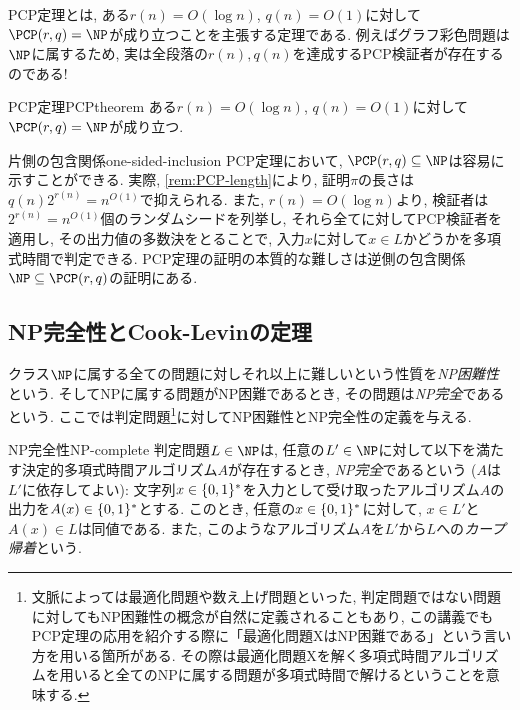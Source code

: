 PCP定理とは, ある$r(n)=O(\log n)$, $q(n)=O(1)$に対して$\PCP(r,q)=\NP$が成り立つことを主張する定理である.
例えばグラフ彩色問題は$\NP$に属するため, 実は全段落の$r(n),q(n)$を達成するPCP検証者が存在するのである!

\begin{theorem}{PCP定理}{PCPtheorem}
  ある$r(n)=O(\log n)$, $q(n)=O(1)$に対して$\PCP(r,q)=\NP$が成り立つ.
\end{theorem}

\begin{remark}{片側の包含関係}{one-sided-inclusion}
  PCP定理において, $\PCP(r,q)\subseteq \NP$は容易に示すことができる.
  実際, \cref{rem:PCP-length}により, 証明$\pi$の長さは$q(n)2^{r(n)} = n^{O(1)}$で抑えられる.
  また, $r(n)=O(\log n)$より, 検証者は$2^{r(n)}=n^{O(1)}$個のランダムシードを列挙し, それら全てに対してPCP検証者を適用し, その出力値の多数決をとることで, 入力$x$に対して$x\in L$かどうかを多項式時間で判定できる.
  PCP定理の証明の本質的な難しさは逆側の包含関係$\NP\subseteq \PCP(r,q)$の証明にある.
\end{remark}

\subsection{NP完全性とCook-Levinの定理}

クラス$\NP$に属する全ての問題に対しそれ以上に難しいという性質を\emph{NP困難性}という.
そしてNPに属する問題がNP困難であるとき, その問題は\emph{NP完全}であるという.
ここでは判定問題\footnote{文脈によっては最適化問題や数え上げ問題といった, 判定問題ではない問題に対してもNP困難性の概念が自然に定義されることもあり, この講義でもPCP定理の応用を紹介する際に「最適化問題XはNP困難である」という言い方を用いる箇所がある. その際は最適化問題Xを解く多項式時間アルゴリズムを用いると全てのNPに属する問題が多項式時間で解けるということを意味する.}に対してNP困難性とNP完全性の定義を与える.

\begin{definition}{NP完全性}{NP-complete}
  判定問題$L\in \NP$は, 任意の$L'\in\NP$に対して以下を満たす決定的多項式時間アルゴリズム$A$が存在するとき, \emph{NP完全}であるという ($A$は$L'$に依存してよい):
  文字列$x\in\{0,1\}^*$を入力として受け取ったアルゴリズム$A$の出力を$A(x)\in\{0,1\}^*$とする.
  このとき, 任意の$x\in\{0,1\}^*$に対して, $x\in L'$と$A(x)\in L$は同値である.
  また, このようなアルゴリズム$A$を$L'$から$L$への\emph{カープ帰着}という.
\end{definition}

